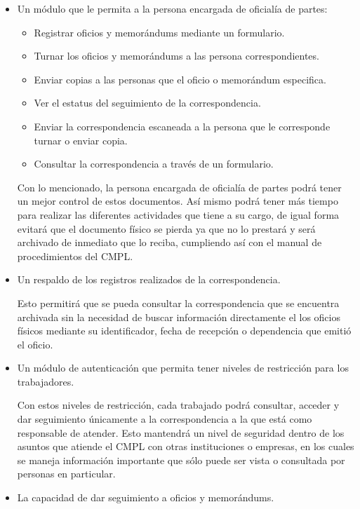 	\begin{itemize}
	
	\item Un módulo que le permita a la persona encargada de oficialía de partes:
		\begin{itemize}
			\item Registrar oficios y memorándums mediante un formulario.
			\item Turnar los oficios y memorándums a las persona correspondientes.
			\item Enviar copias a las personas que el oficio o memorándum especifica.
			\item Ver el estatus del seguimiento de la correspondencia.
			\item Enviar la correspondencia escaneada a la persona que le corresponde turnar o enviar copia.
			\item Consultar la correspondencia a través de un formulario.
			
		\end{itemize}
	Con lo mencionado, la persona encargada de oficialía de partes podrá tener un mejor control de estos documentos. Así mismo podrá tener más tiempo para realizar las diferentes actividades que tiene a su cargo, de igual forma evitará que el documento físico se pierda ya que no lo prestará y será archivado de inmediato que lo reciba, cumpliendo así con el manual de procedimientos del CMPL.
	
	\item Un respaldo de los registros realizados de la correspondencia.
	
Esto permitirá que se pueda consultar la correspondencia que se encuentra archivada sin la necesidad de buscar información directamente el los oficios físicos mediante su identificador, fecha de recepción o dependencia que emitió el oficio.

	\item Un módulo de autenticación que permita tener niveles de restricción para los trabajadores.
	
Con estos niveles de restricción, cada trabajado podrá consultar, acceder y dar seguimiento únicamente a la correspondencia a la que está como responsable de atender. Esto mantendrá un nivel de seguridad dentro de los asuntos que atiende el CMPL con otras instituciones o empresas, en los cuales se maneja información importante que sólo puede ser vista o consultada por personas en particular.
	
	\item La capacidad de dar seguimiento a oficios y memorándums.	
	

\end{itemize}
